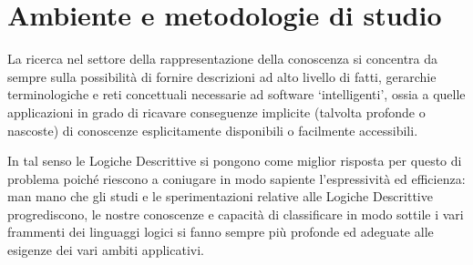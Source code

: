 \section{Ambiente e metodologie di studio}

La  ricerca  nel  settore  della  rappresentazione  della  conoscenza  si  concentra da sempre
sulla possibilità di fornire descrizioni ad alto livello di fatti, gerarchie terminologiche
e reti concettuali necessarie ad software ‘intelligenti’, ossia a quelle applicazioni
in grado di ricavare conseguenze implicite (talvolta profonde o nascoste) di conoscenze 
esplicitamente disponibili o facilmente accessibili. \par
In tal senso le Logiche Descrittive si pongono come miglior risposta per questo di problema
poiché riescono a coniugare in modo sapiente l'espressività ed efficienza: 
man mano che gli studi e le sperimentazioni relative alle Logiche Descrittive progrediscono,
le nostre conoscenze e capacità di classificare in modo sottile i vari frammenti dei
linguaggi logici si fanno sempre più profonde ed adeguate alle esigenze dei vari ambiti applicativi.
  
